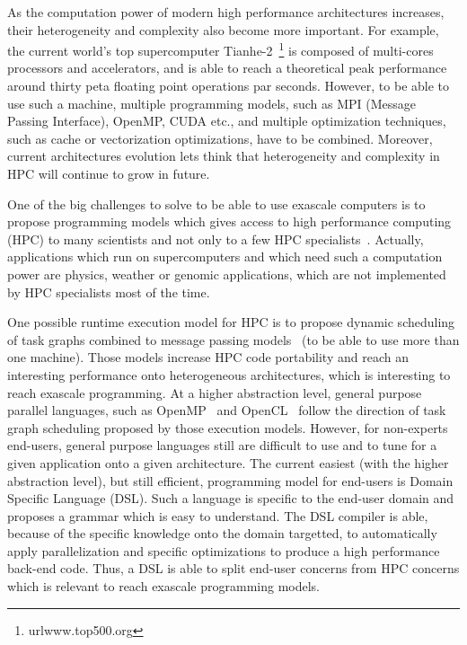 
As the computation power of modern high performance architectures increases, their heterogeneity and complexity also become more important. For example, the current world's top supercomputer Tianhe-2~\footnote{url{www.top500.org}} is composed of multi-cores processors and accelerators, and is able to reach a theoretical peak performance around thirty peta floating point operations par seconds. However, to be able to use such a machine, multiple programming models, such as MPI (Message Passing Interface), OpenMP, CUDA etc., and multiple optimization techniques, such as cache or vectorization optimizations, have to be combined. Moreover, current architectures evolution lets think that heterogeneity and complexity in HPC will continue to grow in future.

One of the big challenges to solve to be able to use exascale computers is to propose programming models which gives access to high performance computing (HPC) to many scientists and not only to a few HPC specialists~\cite{ETP4HPC2013}. Actually, applications which run on supercomputers and which need such a computation power are physics, weather or genomic applications, which are not implemented by HPC specialists most of the time.

One possible runtime execution model for HPC is to propose dynamic scheduling of task graphs combined to message passing models~\cite{Gautier:2013:XRS:2510661.2511383,Augonnet2011,wu:hal-01078359} (to be able to use more than one machine). Those models increase HPC code portability and reach an interesting performance onto heterogeneous architectures, which is interesting to reach exascale programming. At a higher abstraction level, general purpose parallel languages, such as OpenMP~\cite{660313} and OpenCL~\cite{Stone:2010:OPP:622179.1803953} follow the direction of task graph scheduling proposed by those execution models. However, for non-experts end-users, general purpose languages still are difficult to use and to tune for a given application onto a given architecture. The current easiest (with the higher abstraction level), but still efficient, programming model for end-users is Domain Specific Language (DSL). Such a language is specific to the end-user domain and proposes a grammar which is easy to understand. The DSL compiler is able, because of the specific knowledge onto the domain targetted, to automatically apply parallelization and specific optimizations to produce a high performance back-end code. Thus, a DSL is able to split end-user concerns from HPC concerns which is relevant to reach exascale programming models.

